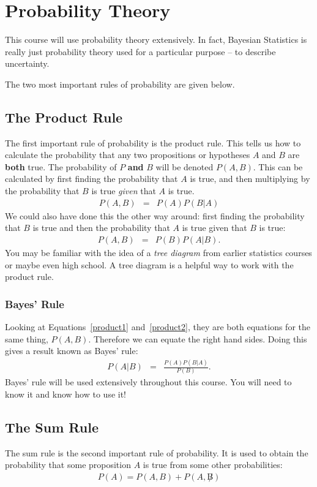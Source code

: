 \chapter{Probability Theory}
This course will use probability theory extensively. In fact, Bayesian
Statistics is really just probability theory used for a particular purpose --
to describe uncertainty.

The two most important rules of probability are given below.

\section{The Product Rule}
The first important rule of probability is the
product rule. This tells us how to calculate the probability that any two
propositions or hypotheses $A$ and $B$ are {\bf both} true.
The probability of $P$ {\bf and}
$B$ will be denoted $P(A, B)$. This can be calculated by first finding the
probability that $A$ is true, and then multiplying by the probability that $B$
is true {\it given} that $A$ is true.
\begin{eqnarray}
P(A, B) &=& P(A)P(B|A)\label{product1}
\end{eqnarray}
We could also have done this the other way around: first finding the
probability that $B$ is true and then the probability that $A$ is true given
that $B$ is true:
\begin{eqnarray}
P(A, B) &=& P(B)P(A|B).\label{product2}
\end{eqnarray}
You may be familiar with the idea of a {\it tree diagram} from earlier
statistics courses or maybe even high school. A tree diagram is a helpful way
to work with the product rule.

\subsection{Bayes' Rule}
Looking at Equations~\ref{product1} and~\ref{product2}, they are both equations
for the same
thing, $P(A,B)$. Therefore we can equate the right hand sides. Doing this gives
a result known as Bayes' rule:
\begin{eqnarray}
P(A|B) &=& \frac{P(A)P(B|A)}{P(B)}. \label{bayes}
\end{eqnarray}
Bayes' rule will be used extensively throughout this course. You will need to
know it and know how to use it!

\section{The Sum Rule}
The sum rule is the second important rule of probability. It is used to obtain
the probability that some proposition $A$ is true from some other
probabilities:
\begin{eqnarray}
P(A) = P(A, B) + P(A, \not B)
\end{eqnarray}

